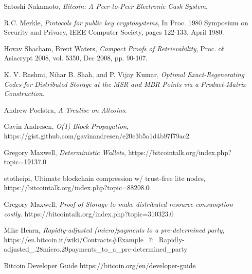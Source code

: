 \documentclass[twocolumn]{article}
\begin{document}
\onecolumn
\begin{thebibliography}{9}

	Satoshi Nakamoto,
	\emph{Bitcoin: A Peer-to-Peer Electronic Cash System}.

	R.C. Merkle,
	\emph{Protocols for public key cryptosystems},
	In Proc. 1980 Symposium on Security and	Privacy,
	IEEE Computer Society, pages 122-133, April 1980.

	Hovav Shacham, Brent Waters,
	\emph{Compact Proofs of Retrievability},
	Proc. of Asiacrypt 2008, vol. 5350, Dec 2008, pp. 90-107.

	K. V. Rashmi, Nihar B. Shah, and P. Vijay Kumar,
	\emph{Optimal Exact-Regenerating Codes for Distributed Storage at the MSR and MBR Points via a Product-Matrix Construction}.

	Andrew Poelstra,
	\emph{A Treatise on Altcoins}.

	Gavin Andresen,
	\emph{O(1) Block Propagation},
	https://gist.github.com/gavinandresen/e20c3b5a1d4b97f79ac2

	Gregory Maxwell,
	\emph{Deterministic Wallets},
	https://bitcointalk.org/index.php?topic=19137.0

	etotheipi,
	Ultimate blockchain compression w/ trust-free lite nodes, \newline
	https://bitcointalk.org/index.php?topic=88208.0

	Gregory Maxwell,
	\emph{Proof of Storage to make distributed resource consumption costly.}
	https://bitcointalk.org/index.php?topic=310323.0

	Mike Hearn,
	\emph{Rapidly-adjusted (micro)payments to a pre-determined party},\newline
	https://en.bitcoin.it/wiki/Contracts\#Example\_7:\_Rapidly-adjusted\_.28micro.29payments\_to\_a\_pre-determined\_party

	Bitcoin Developer Guide
	https://bitcoin.org/en/developer-guide


\end{thebibliography}
\end{document}
